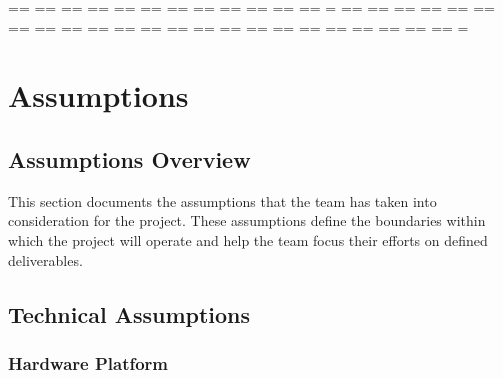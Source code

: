     == == == == == == == == == == == ==
    = %
      == == == == == == == == == == == == == == == == == == == == == == ==
    =

\section {
  Assumptions
}

\subsection{Assumptions Overview}

This section documents the assumptions that the team has taken into consideration for the project. These assumptions define the boundaries within which the project will operate and help the team focus their efforts on defined deliverables.

\subsection{
  Technical Assumptions
}

\subsubsection { Hardware Platform }

